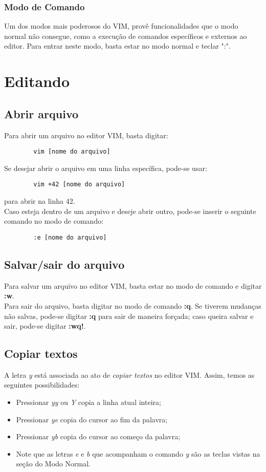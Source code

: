 \documentclass[12pt]{article}
\begin{document}
		\subsubsection{Modo de Comando}
		Um dos modos mais poderosos do VIM, provê funcionalidades que o modo normal não consegue, como a execução de comandos específicos e externos ao editor. Para entrar neste modo, basta estar no modo normal e teclar ":". 
	\newpage

\section{Editando}
	\subsection{Abrir arquivo}
	Para abrir um arquivo no editor VIM, basta digitar:
	\begin{lstlisting}
		vim [nome do arquivo]
	\end{lstlisting}
	Se desejar abrir o arquivo em uma linha específica, pode-se usar:
	\begin{lstlisting}
		vim +42 [nome do arquivo]
	\end{lstlisting}
	para abrir na linha 42. \\
	Caso esteja dentro de um arquivo e deseje abrir outro, pode-se inserir o seguinte comando no modo de comando:
	\begin{lstlisting}
		:e [nome do arquivo]
	\end{lstlisting} 
	\subsection{Salvar/sair do arquivo}
	Para salvar um arquivo no editor VIM, basta estar no modo de comando e digitar \textbf{:w}. \\
	Para sair do arquivo, basta digitar no modo de comando \textbf{:q}. Se tiverem mudanças não salvas, pode-se digitar \textbf{:q} para sair de maneira forçada; caso queira salvar e sair, pode-se digitar \textbf{:wq!}. 
	\subsection{Copiar textos}
	A letra \emph{y} está associada ao ato de \emph{copiar textos} no editor VIM. Assim, temos as seguintes possibilidades:
	\begin{itemize}
		\item Pressionar \emph{yy} ou \emph{Y} copia a linha atual inteira;
		\item Pressionar \emph{ye} copia do cursor ao fim da palavra;
		\item Pressionar \emph{yb} copia do cursor ao começo da palavra;
		\item Note que as letras \emph{e} e \emph{b} que acompanham o comando \emph{y} são as teclas vistas na seção do Modo Normal.
	\end{itemize}
\end{document}
